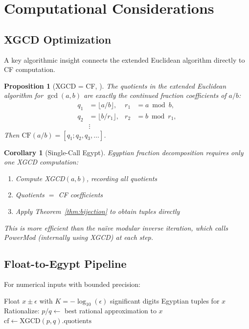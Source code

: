 \documentclass[11pt]{article}
\newtheorem{corollary}[theorem]{Corollary}
\newtheorem{proposition}[theorem]{Proposition}
\theoremstyle{definition}
\theoremstyle{remark}
\begin{document}
\section{Computational Considerations}

\subsection{XGCD Optimization}

A key algorithmic insight connects the extended Euclidean algorithm directly
to CF computation.

\begin{proposition}[XGCD = CF, {\cite[Thm.~164]{hardy-wright}}]\label{prop:xgcd}
The quotients in the extended Euclidean algorithm for $\gcd(a, b)$ are exactly
the continued fraction coefficients of $a/b$:
\begin{align}
q_1 &= \lfloor a/b \rfloor, & r_1 &= a \bmod b, \\
q_2 &= \lfloor b/r_1 \rfloor, & r_2 &= b \bmod r_1, \\
&\vdots
\end{align}
Then $\text{CF}(a/b) = [q_1; q_2, q_3, \ldots]$.
\end{proposition}

\begin{corollary}[Single-Call Egypt]\label{cor:xgcd}
Egyptian fraction decomposition requires only \emph{one} XGCD computation:
\begin{enumerate}
\item Compute XGCD$(a, b)$, recording all quotients
\item Quotients $= $ CF coefficients
\item Apply Theorem~\ref{thm:bijection} to obtain tuples directly
\end{enumerate}
This is more efficient than the na\"ive modular inverse iteration, which
calls PowerMod (internally using XGCD) at each step.
\end{corollary}

\subsection{Float-to-Egypt Pipeline}

For numerical inputs with bounded precision:

\begin{algorithm}[H]
\caption{Arbitrary-Precision Float to Egyptian Fractions}
\begin{algorithmic}[1]
\Require Float $x \pm \epsilon$ with $K = -\log_{10}(\epsilon)$ significant digits
\Ensure Egyptian tuples for $x$
\State Rationalize: $p/q \gets$ best rational approximation to $x$
\State $\text{cf} \gets \text{XGCD}(p, q).\text{quotients}$
\State \Return {} 
\end{algorithmic}
\end{algorithm}
\end{document}

